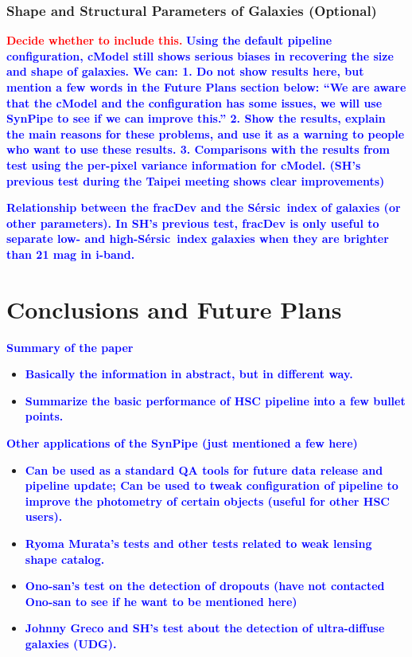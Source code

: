 \documentclass{pasj01}
\def\ser{{S\'{e}rsic\ }}
\newcommand{\plan}[1]{\textcolor{blue} {\textbf{#1}}}
\newcommand{\todo}[1]{\textcolor{red} {\textbf{#1}}}
\begin{document}
\subsubsection{Shape and Structural Parameters of Galaxies (Optional)}
    
    \todo{Decide whether to include this.}
    \plan{Using the default pipeline configuration, cModel still shows serious biases in 
          recovering the size and shape of galaxies.  We can:
          1. Do not show results here, but mention a few words in the Future Plans section 
             below: ``We are aware that the cModel and the configuration has some issues, 
             we will use SynPipe to see if we can improve this.''
          2. Show the results, explain the main reasons for these problems, and use it as 
             a warning to people who want to use these results.
          3. Comparisons with the results from test using the per-pixel variance information 
             for cModel.  (SH's previous test during the Taipei meeting shows clear 
             improvements)
          }
          
    \plan{Relationship between the fracDev and the \ser index of galaxies (or other parameters).  
          In SH's previous test, fracDev is only useful to separate low- and high-\ser index 
          galaxies when they are brighter than 21 mag in i-band.}


\section{Conclusions and Future Plans}

    \plan{Summary of the paper}
    \begin{itemize}
        \item \plan{Basically the information in abstract, but in different way.}
        \item \plan{Summarize the basic performance of HSC pipeline into a few 
                    bullet points.} 
    \end{itemize}
    
    \plan{Other applications of the SynPipe (just mentioned a few here)}
    \begin{itemize}
        \item \plan{Can be used as a standard QA tools for future data release and 
                    pipeline update;  Can be used to tweak configuration of pipeline
                    to improve the photometry of certain objects (useful for 
                    other HSC users).}
        \item \plan{Ryoma Murata's tests and other tests related to weak lensing shape 
                    catalog.}
        \item \plan{Ono-san's test on the detection of dropouts (have not contacted 
                    Ono-san to see if he want to be mentioned here)}
        \item \plan{Johnny Greco and SH's test about the detection of ultra-diffuse 
                    galaxies (UDG).}
    \end{itemize}
\end{document}
